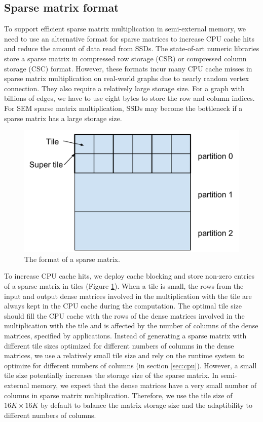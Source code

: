 \subsection{Sparse matrix format}
To support efficient sparse matrix multiplication in semi-external memory,
we need to use an alternative format for sparse matrices to increase CPU cache
hits and reduce the amount of data read from SSDs.
The state-of-art numeric libraries store a sparse matrix in compressed row storage
(CSR) or compressed column storage (CSC) format. However, these formats incur
many CPU cache misses in sparse matrix multiplication on real-world graphs
due to nearly random vertex connection. They also require a relatively
large storage size. For a graph with billions of edges, we have to use eight
bytes to store the row and column indices. For SEM sparse
matrix multiplication, SSDs may become the bottleneck if a sparse matrix has
a large storage size.

\begin{figure}
\centering
\includegraphics[scale=0.3]{./sparse_mat.pdf}
\caption{The format of a sparse matrix.}
\label{sparse_mat}
\end{figure}

To increase CPU cache hits, we deploy cache blocking \cite{Im04} and store
non-zero entries of a sparse matrix in tiles (Figure \ref{sparse_mat}).
When a tile is small, the rows from the input and output dense matrices
involved in the multiplication with the tile are always kept in the CPU cache
during the computation. The optimal tile size should fill the CPU cache
with the rows of the dense matrices involved in the multiplication with
the tile and is affected by the number of columns of the dense matrices,
specified by applications. Instead of generating a sparse matrix with
different tile sizes optimized for different numbers of columns in the dense
matrices, we use a relatively small tile size and rely on the runtime system
to optimize for different numbers of columns (in section \ref{sec:cpu}).
However, a small tile size potentially increases the storage size of the sparse
matrix. In semi-external memory, we expect that the dense matrices have
a very small number of columns in sparse matrix multiplication. Therefore, we
use the tile size of $16K \times 16K$ by default to balance the matrix storage
size and the adaptibility to different numbers of columns.

